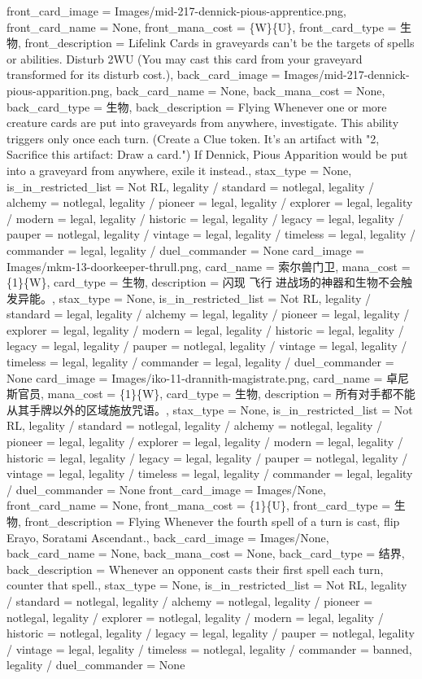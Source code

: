 \documentclass[lang = cn, color = black, 10pt]{AllThatStax}
\begin{document}
\mfcard
{
	front_card_image = Images/mid-217-dennick-pious-apprentice.png,
	front_card_name = None,
	front_mana_cost = \{W\}\{U\},
	front_card_type = 生物,
	front_description = Lifelink
	Cards in graveyards can't be the targets of spells or abilities.
	Disturb {2}{W}{U} (You may cast this card from your graveyard transformed for its disturb cost.),
	back_card_image = Images/mid-217-dennick-pious-apparition.png,
	back_card_name = None,
	back_mana_cost = None,
	back_card_type = 生物,
	back_description = Flying
	Whenever one or more creature cards are put into graveyards from anywhere, investigate. This ability triggers only once each turn. (Create a Clue token. It's an artifact with "{2}, Sacrifice this artifact: Draw a card.")
	If Dennick, Pious Apparition would be put into a graveyard from anywhere, exile it instead.,
	stax_type = None,
	is_in_restricted_list = Not RL,
	legality / standard = notlegal,
	legality / alchemy = notlegal,
	legality / pioneer = legal,
	legality / explorer = legal,
	legality / modern = legal,
	legality / historic = legal,
	legality / legacy = legal,
	legality / pauper = notlegal,
	legality / vintage = legal,
	legality / timeless = legal,
	legality / commander = legal,
	legality / duel_commander = None
}
\card
{
	card_image = Images/mkm-13-doorkeeper-thrull.png,
	card_name = 索尔兽门卫,
	mana_cost = \{1\}\{W\},
	card_type = 生物,
	description = 闪现
	飞行
	进战场的神器和生物不会触发异能。,
	stax_type = None,
	is_in_restricted_list = Not RL,
	legality / standard = legal,
	legality / alchemy = legal,
	legality / pioneer = legal,
	legality / explorer = legal,
	legality / modern = legal,
	legality / historic = legal,
	legality / legacy = legal,
	legality / pauper = notlegal,
	legality / vintage = legal,
	legality / timeless = legal,
	legality / commander = legal,
	legality / duel_commander = None
}
\card
{
	card_image = Images/iko-11-drannith-magistrate.png,
	card_name = 卓尼斯官员,
	mana_cost = \{1\}\{W\},
	card_type = 生物,
	description = 所有对手都不能从其手牌以外的区域施放咒语。,
	stax_type = None,
	is_in_restricted_list = Not RL,
	legality / standard = notlegal,
	legality / alchemy = notlegal,
	legality / pioneer = legal,
	legality / explorer = legal,
	legality / modern = legal,
	legality / historic = legal,
	legality / legacy = legal,
	legality / pauper = notlegal,
	legality / vintage = legal,
	legality / timeless = legal,
	legality / commander = legal,
	legality / duel_commander = None
}
\mfcard
{
	front_card_image = Images/None,
	front_card_name = None,
	front_mana_cost = \{1\}\{U\},
	front_card_type = 生物,
	front_description = Flying
	Whenever the fourth spell of a turn is cast, flip Erayo, Soratami Ascendant.,
	back_card_image = Images/None,
	back_card_name = None,
	back_mana_cost = None,
	back_card_type = 结界,
	back_description = Whenever an opponent casts their first spell each turn, counter that spell.,
	stax_type = None,
	is_in_restricted_list = Not RL,
	legality / standard = notlegal,
	legality / alchemy = notlegal,
	legality / pioneer = notlegal,
	legality / explorer = notlegal,
	legality / modern = legal,
	legality / historic = notlegal,
	legality / legacy = legal,
	legality / pauper = notlegal,
	legality / vintage = legal,
	legality / timeless = notlegal,
	legality / commander = banned,
	legality / duel_commander = None
}
\end{document}
